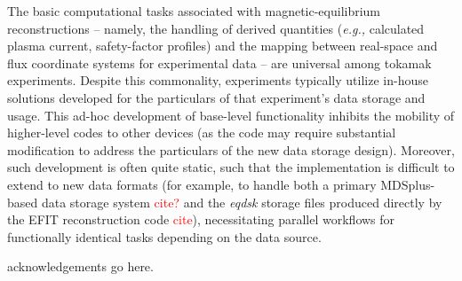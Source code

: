 \documentclass[12pt,floatfix,showpacs]{revtex4-1}
\newcommand{\eg}{\emph{e.g., }}
\newcommand{\note}[1]{\textcolor{red}{#1}}
\begin{document}
The basic computational tasks associated with magnetic-equilibrium reconstructions -- namely, the handling of derived quantities (\eg calculated plasma current, safety-factor profiles) and the mapping between real-space and flux coordinate systems for experimental data -- are universal among tokamak experiments.  Despite this commonality, experiments typically utilize in-house solutions developed for the particulars of that experiment's data storage and usage.  This ad-hoc development of base-level functionality inhibits the mobility of higher-level codes to other devices (as the code may require substantial modification to address the particulars of the new data storage design).  Moreover, such development is often quite static, such that the implementation is difficult to extend to new data formats (for example, to handle both a primary MDSplus-based data storage system \note{cite?} and the \emph{eqdsk} storage files produced directly by the EFIT reconstruction code \note{cite}), necessitating parallel workflows for functionally identical tasks depending on the data source.


\begin{acknowledgements}
 acknowledgements go here.
\end{acknowledgements}

\end{document}
